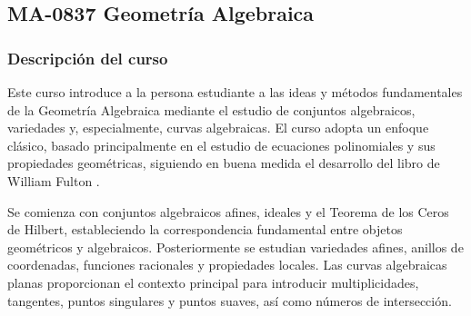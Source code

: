 \newpage
\subsection*{MA-0837 Geometría Algebraica}

\hypertarget{MA0837}{}
\begin{refsection}
\begin{table}[H]
\end{table}

\subsubsection*{Descripción del curso}

Este curso introduce a la persona estudiante a las ideas y métodos fundamentales de la Geometría Algebraica mediante el estudio de conjuntos algebraicos, variedades y, especialmente, curvas algebraicas. El curso adopta un enfoque clásico, basado principalmente en el estudio de ecuaciones polinomiales y sus propiedades geométricas, siguiendo en buena medida el desarrollo del libro de William Fulton \cite{Ful89}.

Se comienza con conjuntos algebraicos afines, ideales y el Teorema de los Ceros de Hilbert, estableciendo la correspondencia fundamental entre objetos geométricos y algebraicos. Posteriormente se estudian variedades afines, anillos de coordenadas, funciones racionales y propiedades locales. Las curvas algebraicas planas proporcionan el contexto principal para introducir multiplicidades, tangentes, puntos singulares y puntos suaves, así como números de intersección.


\end{refsection}
